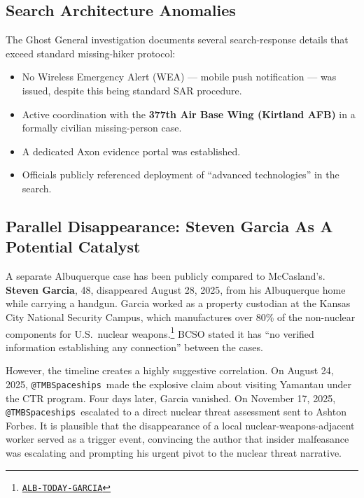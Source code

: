 \documentclass[11pt]{article}
\makeatletter
\newcommand{\account}{\texttt{@TMBSpaceships}}
\newcommand{\src}[2]{\href{#1}{\texttt{#2}}}
\makeatother
\begin{document}
\subsection{Search Architecture Anomalies}

The Ghost General investigation documents several search-response details that exceed standard missing-hiker protocol:

\begin{itemize}
  \item No Wireless Emergency Alert (WEA) — mobile push notification — was issued, despite this being standard SAR procedure.
  \item Active coordination with the \textbf{377th Air Base Wing (Kirtland AFB)} in a formally civilian missing-person case.
  \item A dedicated Axon evidence portal was established.
  \item Officials publicly referenced deployment of ``advanced technologies'' in the search.
\end{itemize}

\subsection{Parallel Disappearance: Steven Garcia As A Potential Catalyst}

A separate Albuquerque case has been publicly compared to McCasland's. \textbf{Steven Garcia}, 48, disappeared August 28, 2025, from his Albuquerque home while carrying a handgun. Garcia worked as a property custodian at the Kansas City National Security Campus, which manufactures over 80\% of the non-nuclear components for U.S.\ nuclear weapons.\footnote{\src{https://nationaltoday.com/us/nm/albuquerque/news/2026/04/14/missing-government-security-contractor-compared-to-retired-generals-disappearance/}{ALB-TODAY-GARCIA}} BCSO stated it has ``no verified information establishing any connection'' between the cases.

However, the timeline creates a highly suggestive correlation. On August 24, 2025, \account\ made the explosive claim about visiting Yamantau under the CTR program. Four days later, Garcia vanished. On November 17, 2025, \account\ escalated to a direct nuclear threat assessment sent to Ashton Forbes. It is plausible that the disappearance of a local nuclear-weapons-adjacent worker served as a trigger event, convincing the author that insider malfeasance was escalating and prompting his urgent pivot to the nuclear threat narrative.
\end{document}

